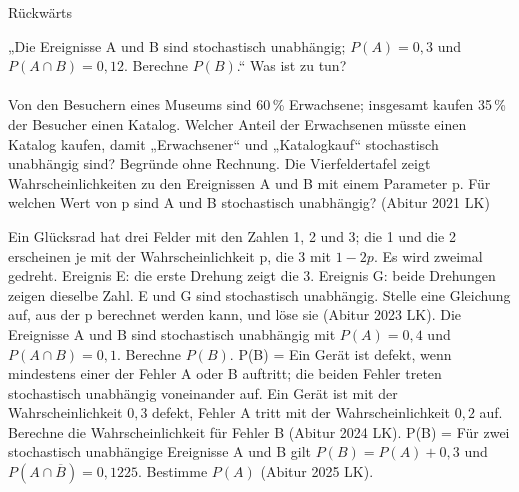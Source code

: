 \setcounter{aufgabe}{11}

\begin{aufgabe}{Rückwärts}
\begin{teile}
\teil „Die Ereignisse A und B sind stochastisch unabhängig; $P(A) = 0{,}3$ und $P(A \cap B) = 0{,}12$. Berechne $P(B)$.“ Was ist zu tun? \\  \\ 
\teil Von den Besuchern eines Museums sind 60\,\% Erwachsene; insgesamt kaufen 35\,\% der Besucher einen Katalog. Welcher Anteil der Erwachsenen müsste einen Katalog kaufen, damit „Erwachsener“ und „Katalogkauf“ stochastisch unabhängig sind? Begründe ohne Rechnung.
\teil Die Vierfeldertafel zeigt Wahrscheinlichkeiten zu den Ereignissen A und B mit einem Parameter p. Für welchen Wert von p sind A und B stochastisch unabhängig? \hfill (Abitur 2021 LK)

\teil Ein Glücksrad hat drei Felder mit den Zahlen 1, 2 und 3; die 1 und die 2 erscheinen je mit der Wahrscheinlichkeit p, die 3 mit $1 - 2p$. Es wird zweimal gedreht. Ereignis E: die erste Drehung zeigt die 3. Ereignis G: beide Drehungen zeigen dieselbe Zahl. E und G sind stochastisch unabhängig. Stelle eine Gleichung auf, aus der p berechnet werden kann, und löse sie \hfill (Abitur 2023 LK).
\teil Die Ereignisse A und B sind stochastisch unabhängig mit $P(A) = 0{,}4$ und $P(A \cap B) = 0{,}1$. Berechne $P(B)$. P(B) = \leerfeld
\teil Ein Gerät ist defekt, wenn mindestens einer der Fehler A oder B auftritt; die beiden Fehler treten stochastisch unabhängig voneinander auf. Ein Gerät ist mit der Wahrscheinlichkeit $0{,}3$ defekt, Fehler A tritt mit der Wahrscheinlichkeit $0{,}2$ auf. Berechne die Wahrscheinlichkeit für Fehler B \hfill (Abitur 2024 LK). P(B) = \leerfeld
\teil Für zwei stochastisch unabhängige Ereignisse A und B gilt $P(B) = P(A) + 0{,}3$ und $P(A \cap \overline{B}) = 0{,}1225$. Bestimme $P(A)$ \hfill (Abitur 2025 LK).
\end{teile}
\end{aufgabe}

